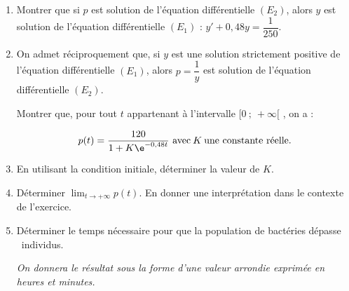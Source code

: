 \begin{enumerate}
\item Montrer que si $p$ est solution de l'équation différentielle $(E_2)$, alors $y$ est solution de l'équation différentielle $(E_1)$ : \quad $y' + 0,48y = \dfrac{1}{250}$.
\item On admet réciproquement que, si $y$ est une solution strictement positive de l'équation différentielle $(E_1)$, alors $p = \dfrac 1y$ est solution de l'équation différentielle $(E_2)$.

Montrer que, pour tout $t$ appartenant à l'intervalle $[0~;~ +\infty[$ , on a :

\[p(t) = \dfrac{120}{1 + K\e^{-0,48t}}~ \text{avec}\: K\: \text{une constante réelle}.\] 
\item En utilisant la condition initiale, déterminer la valeur de $K$.
\item Déterminer $\displaystyle\lim_{t \to + \infty} p(t)$. En donner une interprétation dans le contexte de l'exercice.
\item Déterminer le temps nécessaire pour que la population de bactéries dépasse ~individus.

\emph{On donnera le résultat sous la forme d'une valeur arrondie exprimée en heures et minutes.}
\end{enumerate}

